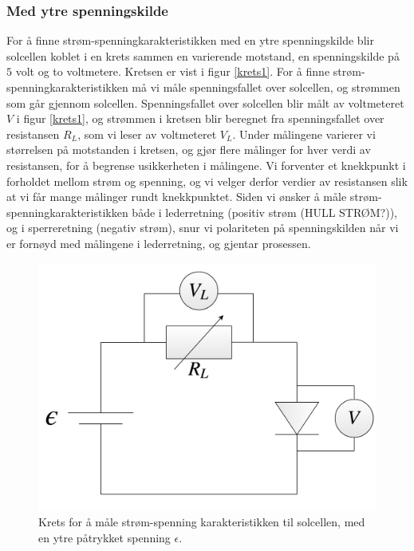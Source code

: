 \documentclass[%
 reprint,
 amsmath,amssymb,
 aps,
 norsk,
 booktabs
]{revtex4-1}
\begin{document}
\subsubsection{Med ytre spenningskilde}
For å finne strøm-spenningkarakteristikken med en ytre spenningskilde blir solcellen koblet i en krets sammen en varierende motstand, en spenningskilde på $5$ volt og to voltmetere. Kretsen er vist i figur \vref{krets1}. For å finne strøm-spenningkarakteristikken må vi måle spenningsfallet over solcellen, og strømmen som går gjennom solcellen. Spenningsfallet over solcellen blir målt av voltmeteret $V$ i figur \vref{krets1}, og strømmen i kretsen blir beregnet fra spenningsfallet over resistansen $R_L$, som vi leser av voltmeteret $V_L$. Under målingene varierer vi størrelsen på motstanden i kretsen, og gjør flere målinger for hver verdi av resistansen, for å begrense usikkerheten i målingene. Vi forventer et knekkpunkt i forholdet mellom strøm og spenning, og vi velger derfor verdier av resistansen slik at vi får mange målinger rundt knekkpunktet. Siden vi ønsker å måle strøm-spenningkarakteristikken både i lederretning (positiv strøm (HULL STRØM?)), og i sperreretning (negativ strøm), snur vi polariteten på spenningskilden når vi er fornøyd med målingene i lederretning, og gjentar prosessen.
\begin{figure}[h!]
  \centering
  \includegraphics[scale=0.15]{krets1.png}
  \caption{Krets for å måle strøm-spenning karakteristikken til solcellen, med en ytre påtrykket spenning $\epsilon$.}
  \label{krets1}
\end{figure}
\end{document}
